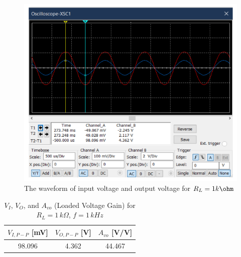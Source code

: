 

\begin{figure}[H]
    \centering
    \includegraphics[width=16cm]{Pictures/Waveform-RL.png}
    \caption{{The waveform of input voltage and output voltage for $R_L = 1k\ohm$}}
    \label{waveform-rl-dia}
\end{figure}

\begin{table}[H]
\centering
\begin{tabular}{|c|c|c|}
\hline\hline
\textbf{\(V_{I, P-P}\) [mV]} & \textbf{\(V_{O, P-P}\) [V]} & \textbf{\(A_{vo}\) [V/V]} \\ \hline
98.096 & 4.362 & 44.467 \\ \hline\hline
\end{tabular}
\caption{\(V_I\), \(V_O\), and \(A_{vo}\) (Loaded Voltage Gain) for \(R_L = 1 \, k\Omega\), \(f = 1 \, kHz\)}
\label{table:E1}
\end{table}


